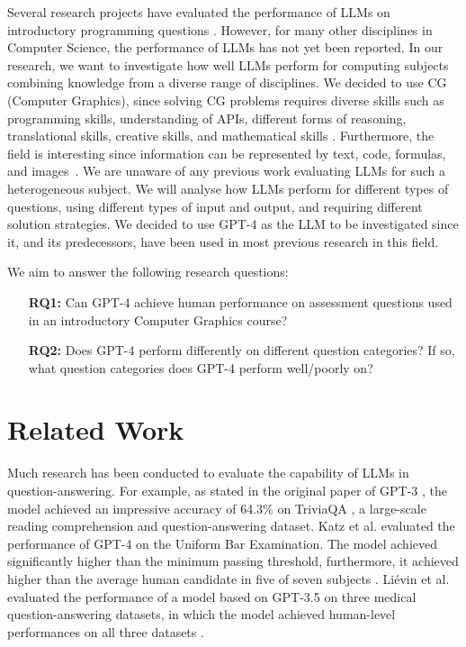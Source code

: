 \documentclass[sigconf,review]{acmart}
\begin{document}
Several research projects have evaluated the performance of LLMs on introductory programming questions \cite{testcodex, testcopilot, testgpt}. However, for many other disciplines in Computer Science, the performance of LLMs has not yet been reported. In our research, we want to investigate how well LLMs perform for computing subjects combining knowledge from a diverse range of disciplines. We decided to use CG (Computer Graphics), since solving CG problems requires diverse skills such as programming skills, understanding of APIs, different forms of reasoning, translational skills, creative skills, and mathematical skills \cite{Suselo2017,Rodrigues2021}. Furthermore, the field is interesting since information can be represented by text, code, formulas, and images~\cite{Suselo2022a,Suselo2022b}.  We are unaware of any previous work evaluating LLMs for such a heterogeneous subject. We will analyse how LLMs perform for different types of questions, using different types of input and output, and requiring different solution strategies. 
We decided to use GPT-4 as the LLM to be investigated since it, and its predecessors, have been used in most previous research in this field.

We aim to answer the following research questions:
\begin{enumerate}
    \item[\textbf{RQ1:}] Can GPT-4 achieve human performance on assessment questions used in an introductory Computer Graphics course?
    \item[\textbf{RQ2:}] Does GPT-4 perform differently on different question categories? If so, what question categories does GPT-4 perform well/poorly on?
\end{enumerate}

\section{Related Work}
Much research has been conducted to evaluate the capability of LLMs in question-answering. For example, as stated in the original paper of GPT-3 \cite{gpt3}, the model achieved an impressive accuracy of 64.3\% on TriviaQA \cite{triviaqa}, a large-scale reading comprehension and question-answering dataset. Katz et al. evaluated the performance of GPT-4 on the Uniform Bar Examination. The model achieved significantly higher than the minimum passing threshold, furthermore, it achieved higher than the average human candidate in five of seven subjects \cite{testbar}. Liévin et al. evaluated the performance of a model based on GPT-3.5 on three medical question-answering datasets, in which the model achieved human-level performances on all three datasets \cite{testmed}.
\end{document}

